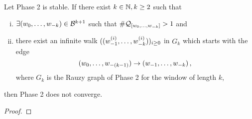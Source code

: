\begin{thm}
Let Phase 2 is stable. If there exist $k\in\NN, k\geq 2$ such that
\begin{enumerate}[i)]
	\item $\exists \tupleo{k}\in\B^{k+1}$ such that $\#\Qwo{k}>1$ and
	\item there exist an infinite walk $(\tuple[w^{(i)}]{1}{k})_{i\geq 0}$ in $G_k$ which starts with the edge $$\tupleo{(k-1)}\rightarrow\tuple{1}{k}\,,$$ where $G_k$ is the Rauzy graph of Phase 2 for the window of length $k$,
\end{enumerate}
then Phase 2 does not converge.
\end{thm}
\begin{proof}

\end{proof}